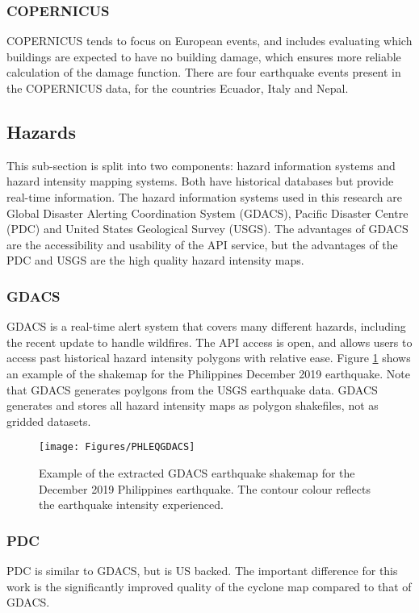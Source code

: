 \documentclass[10pt,a4paper]{article}
\begin{document}
\begin{multicols}{1}
\subsubsection{COPERNICUS}\label{sec:COPER}
COPERNICUS tends to focus on European events, and includes evaluating which buildings are expected to have no building damage, which ensures more reliable calculation of the damage function. There are four earthquake events present in the COPERNICUS data, for the countries Ecuador, Italy and Nepal.
\subsection{Hazards}\label{sec:hazard}
This sub-section is split into two components: hazard information systems and hazard intensity mapping systems. Both have historical databases but provide real-time information. The hazard information systems used in this research are Global Disaster Alerting Coordination System (GDACS), Pacific Disaster Centre (PDC) and United States Geological Survey (USGS). The advantages of GDACS are the accessibility and usability of the API service, but the advantages of the PDC and USGS are the high quality hazard intensity maps.
\subsubsection{GDACS}\label{sec:GDACS}
GDACS is a real-time alert system that covers many different hazards, including the recent update to handle wildfires. The API access is open, and allows users to access past historical hazard intensity polygons with relative ease. Figure \ref{fig:GDACS} shows an example of the shakemap for the Philippines December 2019 earthquake. Note that GDACS generates poylgons from the USGS earthquake data. GDACS generates and stores all hazard intensity maps as polygon shakefiles, not as gridded datasets.
\begin{figure}[H]
   \texttt{[image: Figures/PHLEQGDACS]}
 	\caption{Example of the extracted GDACS earthquake shakemap for the December 2019 Philippines earthquake. The contour colour reflects the earthquake intensity experienced.}
 	\label{fig:GDACS}
\end{figure}
\subsubsection{PDC}\label{sec:PDC}
PDC is similar to GDACS, but is US backed. The important difference for this work is the significantly improved quality of the cyclone map compared to that of GDACS.

\end{multicols}
\end{document}
